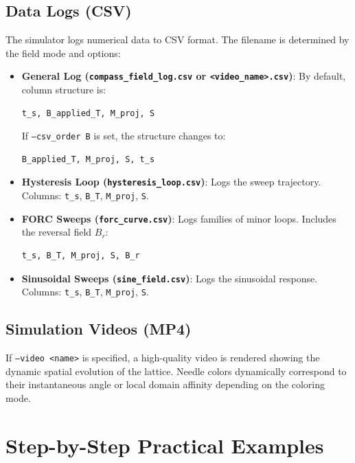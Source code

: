 \documentclass[11pt,a4paper]{article}
\newcommand{\code}[1]{\texttt{#1}}
\begin{document}
\subsection{Data Logs (CSV)}
The simulator logs numerical data to CSV format. The filename is determined by the field mode and options:
\begin{itemize}
    \item \textbf{General Log (\code{compass\_field\_log.csv} or \code{<video\_name>.csv})}:
    By default, column structure is:
    \begin{lstlisting}[backgroundcolor=\color{white},frame=none]
t_s, B_applied_T, M_proj, S
    \end{lstlisting}
    If \code{--csv\_order B} is set, the structure changes to:
    \begin{lstlisting}[backgroundcolor=\color{white},frame=none]
B_applied_T, M_proj, S, t_s
    \end{lstlisting}
    
    \item \textbf{Hysteresis Loop (\code{hysteresis\_loop.csv})}:
    Logs the sweep trajectory. Columns: \code{t\_s}, \code{B\_T}, \code{M\_proj}, \code{S}.
    
    \item \textbf{FORC Sweeps (\code{forc\_curve.csv})}:
    Logs families of minor loops. Includes the reversal field $B_r$:
    \begin{lstlisting}[backgroundcolor=\color{white},frame=none]
t_s, B_T, M_proj, S, B_r
    \end{lstlisting}
    
    \item \textbf{Sinusoidal Sweeps (\code{sine\_field.csv})}:
    Logs the sinusoidal response. Columns: \code{t\_s}, \code{B\_T}, \code{M\_proj}, \code{S}.
\end{itemize}

\subsection{Simulation Videos (MP4)}
If \code{--video <name>} is specified, a high-quality video is rendered showing the dynamic spatial evolution of the lattice. Needle colors dynamically correspond to their instantaneous angle or local domain affinity depending on the coloring mode.


\newpage
\section{Step-by-Step Practical Examples}
\label{sec:examples}
\end{document}
